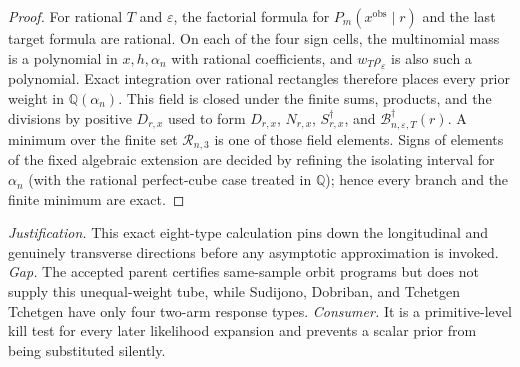 \documentclass{article}
\begin{document}
\begin{proof}
For rational \(T\) and \(\varepsilon\), the factorial formula for \(P_m(x^{\mathrm{obs}}\mid r)\) and the last target formula are rational.  On each of the four sign cells, the multinomial mass is a polynomial in \(x,h,\alpha_n\) with rational coefficients, and \(w_T\rho_\varepsilon\) is also such a polynomial.  Exact integration over rational rectangles therefore places every prior weight in \(\mathbb Q(\alpha_n)\).  This field is closed under the finite sums, products, and the divisions by positive \(D_{r,x}\) used to form \(D_{r,x}\), \(N_{r,x}\), \(S_{r,x}^\dagger\), and \(\mathcal B_{n,\varepsilon,T}^\dagger(r)\).  A minimum over the finite set \(\mathcal R_{n,3}\) is one of those field elements.  Signs of elements of the fixed algebraic extension are decided by refining the isolating interval for \(\alpha_n\) (with the rational perfect-cube case treated in \(\mathbb Q\)); hence every branch and the finite minimum are exact.
\end{proof}
\par\smallskip\noindent \textit{Justification.} This exact eight-type calculation pins down the longitudinal and genuinely transverse directions before any asymptotic approximation is invoked. \textit{Gap.} The accepted parent certifies same-sample orbit programs but does not supply this unequal-weight tube, while Sudijono, Dobriban, and Tchetgen Tchetgen have only four two-arm response types. \textit{Consumer.} It is a primitive-level kill test for every later likelihood expansion and prevents a scalar prior from being substituted silently.
\end{document}
